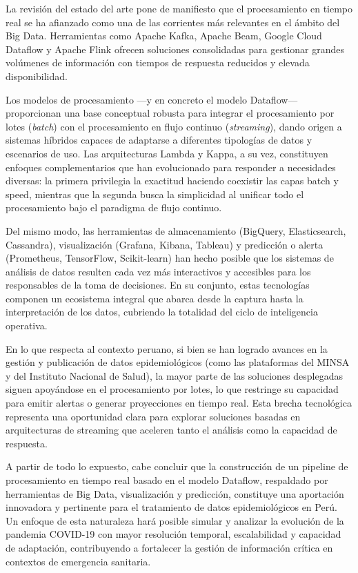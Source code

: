 \documentclass[12pt,a4paper]{article}
\begin{document}
La revisión del estado del arte pone de manifiesto que el procesamiento en tiempo real se ha afianzado como una de las corrientes más relevantes en el ámbito del Big Data. Herramientas como Apache Kafka, Apache Beam, Google Cloud Dataflow y Apache Flink ofrecen soluciones consolidadas para gestionar grandes volúmenes de información con tiempos de respuesta reducidos y elevada disponibilidad.

Los modelos de procesamiento ---y en concreto el modelo Dataflow--- proporcionan una base conceptual robusta para integrar el procesamiento por lotes (\emph{batch}) con el procesamiento en flujo continuo (\emph{streaming}), dando origen a sistemas híbridos capaces de adaptarse a diferentes tipologías de datos y escenarios de uso. Las arquitecturas Lambda y Kappa, a su vez, constituyen enfoques complementarios que han evolucionado para responder a necesidades diversas: la primera privilegia la exactitud haciendo coexistir las capas batch y speed, mientras que la segunda busca la simplicidad al unificar todo el procesamiento bajo el paradigma de flujo continuo.

Del mismo modo, las herramientas de almacenamiento (BigQuery, Elasticsearch, Cassandra), visualización (Grafana, Kibana, Tableau) y predicción o alerta (Prometheus, TensorFlow, Scikit-learn) han hecho posible que los sistemas de análisis de datos resulten cada vez más interactivos y accesibles para los responsables de la toma de decisiones. En su conjunto, estas tecnologías componen un ecosistema integral que abarca desde la captura hasta la interpretación de los datos, cubriendo la totalidad del ciclo de inteligencia operativa.

En lo que respecta al contexto peruano, si bien se han logrado avances en la gestión y publicación de datos epidemiológicos (como las plataformas del MINSA y del Instituto Nacional de Salud), la mayor parte de las soluciones desplegadas siguen apoyándose en el procesamiento por lotes, lo que restringe su capacidad para emitir alertas o generar proyecciones en tiempo real. Esta brecha tecnológica representa una oportunidad clara para explorar soluciones basadas en arquitecturas de streaming que aceleren tanto el análisis como la capacidad de respuesta.

A partir de todo lo expuesto, cabe concluir que la construcción de un pipeline de procesamiento en tiempo real basado en el modelo Dataflow, respaldado por herramientas de Big Data, visualización y predicción, constituye una aportación innovadora y pertinente para el tratamiento de datos epidemiológicos en Perú.\\
Un enfoque de esta naturaleza hará posible simular y analizar la evolución de la pandemia COVID-19 con mayor resolución temporal, escalabilidad y capacidad de adaptación, contribuyendo a fortalecer la gestión de información crítica en contextos de emergencia sanitaria.
\end{document}
